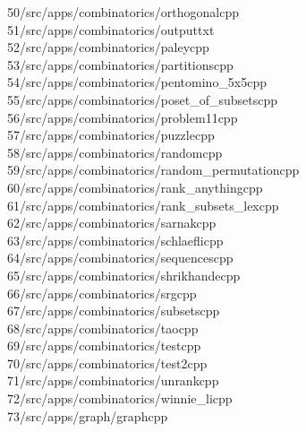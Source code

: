 \begin{tabbing}
50\>/src/apps/combinatorics/orthogonalcpp\\[0pt]
51\>/src/apps/combinatorics/outputtxt\\[0pt]
52\>/src/apps/combinatorics/paleycpp\\[0pt]
53\>/src/apps/combinatorics/partitionscpp\\[0pt]
54\>/src/apps/combinatorics/pentomino\_5x5cpp\\[0pt]
55\>/src/apps/combinatorics/poset\_of\_subsetscpp\\[0pt]
56\>/src/apps/combinatorics/problem11cpp\\[0pt]
57\>/src/apps/combinatorics/puzzlecpp\\[0pt]
58\>/src/apps/combinatorics/randomcpp\\[0pt]
59\>/src/apps/combinatorics/random\_permutationcpp\\[0pt]
60\>/src/apps/combinatorics/rank\_anythingcpp\\[0pt]
61\>/src/apps/combinatorics/rank\_subsets\_lexcpp\\[0pt]
62\>/src/apps/combinatorics/sarnakcpp\\[0pt]
63\>/src/apps/combinatorics/schlaeflicpp\\[0pt]
64\>/src/apps/combinatorics/sequencescpp\\[0pt]
65\>/src/apps/combinatorics/shrikhandecpp\\[0pt]
66\>/src/apps/combinatorics/srgcpp\\[0pt]
67\>/src/apps/combinatorics/subsetscpp\\[0pt]
68\>/src/apps/combinatorics/taocpp\\[0pt]
69\>/src/apps/combinatorics/testcpp\\[0pt]
70\>/src/apps/combinatorics/test2cpp\\[0pt]
71\>/src/apps/combinatorics/unrankcpp\\[0pt]
72\>/src/apps/combinatorics/winnie\_licpp\\[0pt]
73\>/src/apps/graph/graphcpp\\[0pt]

\end{tabbing}
